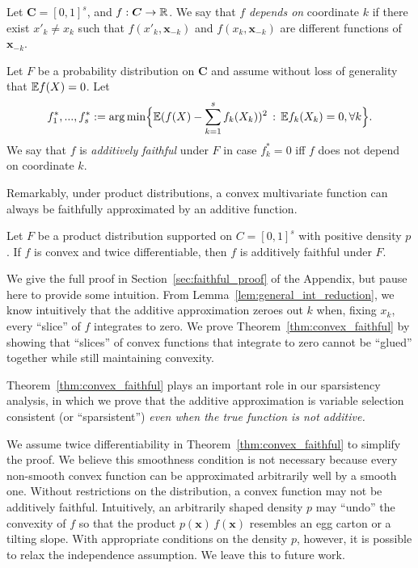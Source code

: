 \begin{definition}
  Let $\mathbf{C}=[0,1]^s$, and $f:\mbox{\boldmath $C$}\rightarrow {\mathbb R}$. We say
  that $f$ \emph{depends on} coordinate $k$ if there exist $x'_k \neq
  x_k$ such that $f(x'_k, \mathbf{x}_{-k})$ and $f(x_k,
  \mathbf{x}_{-k})$ are different functions of $\mathbf{x}_{-k}$.

Let $F$ be a probability distribution on $\mathbf{C}$ and
assume without loss of generality that ${\mathbb E} f(X) = 0$. Let 
$$\displaystyle f^*_1,...,f^*_s := \arg\min \Bigl\{ {\mathbb E} ( f(X) - \sum_{k=1}^s
f_k(X_k) )^2 \,:\, {\mathbb E} f_k(X_k) = 0, \forall k\Bigr\}.$$
We say that $f$ is \emph{additively faithful} under $F$ in case $f^*_k = 0$ iff $f$ does not depend on coordinate $k$. 
\end{definition}

Remarkably, under product distributions, a convex multivariate function can always be faithfully approximated by an additive function. 

\begin{theorem}
\label{thm:convex_faithful}
Let $F$ be a product distribution supported on $C=[0,1]^s$ with positive density $p$. If $f$ is convex and twice differentiable, then $f$ is additively faithful under $F$.
\end{theorem}

We give the full proof in Section~\ref{sec:faithful_proof} of the
Appendix, but pause here to provide some intuition. From
Lemma~\ref{lem:general_int_reduction}, we know intuitively that the
additive approximation zeroes out $k$ when, fixing $x_k$, every
``slice'' of $f$ integrates to zero. We prove
Theorem~\ref{thm:convex_faithful} by showing that ``slices'' of convex
functions that integrate to zero cannot be ``glued'' together while
still maintaining convexity.

Theorem~\ref{thm:convex_faithful} plays an important role in our
sparsistency analysis, in which we prove that the additive
approximation is variable selection consistent (or ``sparsistent'') \emph{even when the true function is not
additive.}

\begin{remark}
  We assume twice differentiability in
  Theorem~\ref{thm:convex_faithful} to simplify the proof. We believe
  this smoothness condition is not necessary because every non-smooth
  convex function can be approximated arbitrarily well by a smooth
  one.  Without restrictions on the distribution, a convex
  function may not be additively faithful. Intuitively, an arbitrarily shaped
  density $p$
  may ``undo'' the convexity of $f$ so that the product
  $p(\mathbf{x}) \, f(\mathbf{x})$ resembles an egg carton or a
  tilting slope.  With appropriate conditions on the density $p$,
  however, it is possible to relax the independence assumption.  We leave this to
  future work.
\end{remark}
